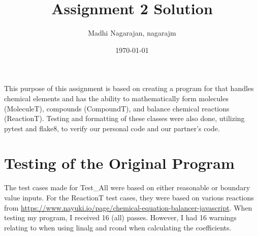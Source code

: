 \documentclass[12pt]{article}
\title{Assignment 2 Solution}
\author{Madhi Nagarajan, nagarajm}
\date{\today}
\begin{document}
\maketitle

This purpose of this assignment is based on creating a program for that handles chemical elements
and has the ability to mathematically form molecules (MoleculeT), compounds (CompoundT), and balance chemical reactions (ReactionT). Testing and formatting of these classes were also done, utilizing pytest and flake8, to verify our personal code and our partner's code.

\section{Testing of the Original Program}
The test cases made for Test\_All were based on either reasonable or boundary value inputs. For the ReactionT test cases, they were based on various reactions from \url{https://www.nayuki.io/page/chemical-equation-balancer-javascript}. When testing my program, I received 16 (all) passes. However, I had 16 warnings relating to when using linalg and rcond when calculating the coefficients.
\end{document}
